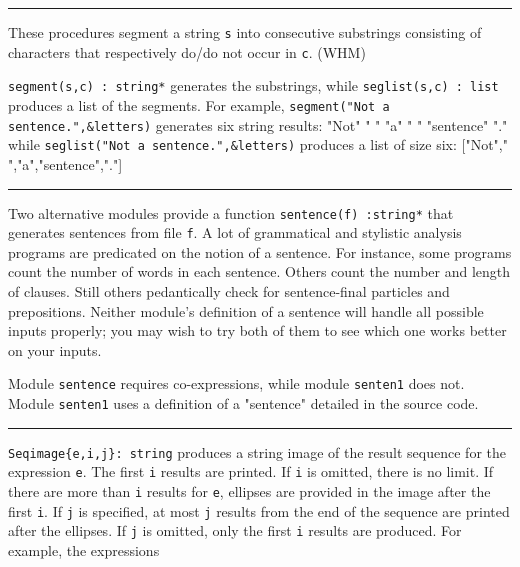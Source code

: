 \vspace{0.25cm}\hrule{}

These procedures segment a string \texttt{s} into consecutive substrings
consisting of characters that respectively do/do not occur in
\texttt{c}. (WHM)

\texttt{segment(s,c)}\texttt{ : string*} generates
the substrings, while \texttt{seglist(s,c) : list} produces a list of
the segments. For example, \texttt{segment("Not a
sentence.",\&letters)} generates six string results:
"Not" " "
"a" " "
"sentence" "."
while \texttt{seglist("Not a
sentence.",\&letters)} produces a list of size six:
["Not"," ","a","sentence","."]


\vspace{0.25cm}\hrule{}

Two alternative modules provide a function \texttt{sentence(f) :string*}
that generates sentences from file
\texttt{f}. A lot of grammatical and stylistic analysis programs are
predicated on the notion of a sentence. For instance, some programs
count the number of words in each sentence. Others count the number and
length of clauses. Still others pedantically check for sentence-final
particles and prepositions. Neither module's
definition of a sentence will handle all possible inputs properly; you
may wish to try both of them to see which one works better on your
inputs.

Module \texttt{sentence} requires co-expressions, while module
\texttt{senten1} does not. Module \texttt{senten1} uses a definition of
a "sentence" detailed in the source code.

\vspace{0.25cm}\hrule{}

\texttt{Seqimage\{e,i,j\}: string} produces a string image of the result
sequence for the expression \texttt{e}.  The first \texttt{i}
results are printed. If \texttt{i} is omitted, there is no limit. If
there are more than \texttt{i} results for \texttt{e}, ellipses are
provided in the image after the first \texttt{i}. If \texttt{j} is
specified, at most \texttt{j} results from the end of the sequence are
printed after the ellipses. If \texttt{j} is omitted, only the first
\texttt{i} results are produced. For example, the expressions 

